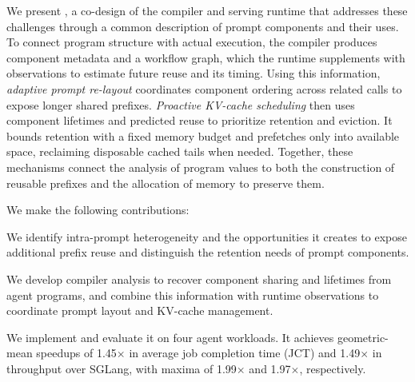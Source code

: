 We present \sysname, a co-design of the compiler and serving runtime that addresses these challenges through a common description of prompt components and their uses. To connect program structure with actual execution, the compiler produces component metadata and a workflow graph, which the runtime supplements with observations to estimate future reuse and its timing. Using this information, \emph{adaptive prompt re-layout} coordinates component ordering across related calls to expose longer shared prefixes. \emph{Proactive KV-cache scheduling} then uses component lifetimes and predicted reuse to prioritize retention and eviction. It bounds retention with a fixed memory budget and prefetches only into available space, reclaiming disposable cached tails when needed. Together, these mechanisms connect the analysis of program values to both the construction of reusable prefixes and the allocation of memory to preserve them.

We make the following contributions:
\begin{enumerate*}[label=\textbf{(\roman*)}]
    \item We identify intra-prompt heterogeneity and the opportunities it creates to expose additional prefix reuse and distinguish the retention needs of prompt components.
    \item We develop compiler analysis to recover component sharing and lifetimes from agent programs, and combine this information with runtime observations to coordinate prompt layout and KV-cache management.
    \item We implement \sysname and evaluate it on four agent workloads. It achieves geometric-mean speedups of 1.45$\times$ in average job completion time (JCT) and 1.49$\times$ in throughput over SGLang, with maxima of 1.99$\times$ and 1.97$\times$, respectively.
\end{enumerate*}

